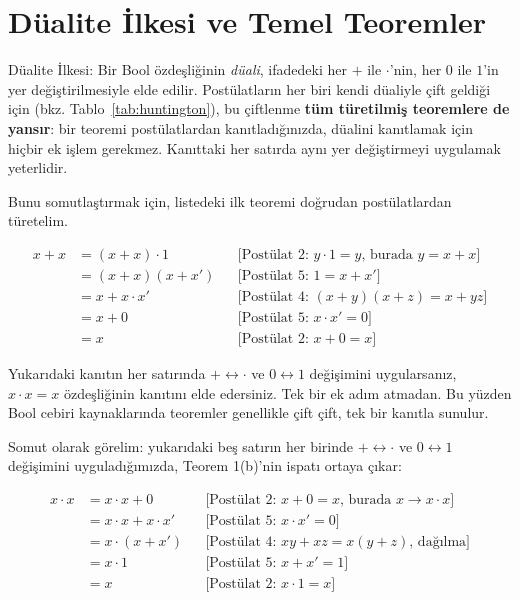 \section{Düalite İlkesi ve Temel Teoremler}
\label{sec:dualite}

\begin{tanim}{Düalite İlkesi:}
Bir Bool özdeşliğinin \emph{düali}, ifadedeki her $+$ ile $\cdot$'nin, her $0$ ile $1$'in yer
değiştirilmesiyle elde edilir. Postülatların her biri kendi düaliyle çift geldiği için (bkz.
Tablo~\ref{tab:huntington}), bu çiftlenme \textbf{tüm türetilmiş teoremlere de yansır}: bir teoremi
postülatlardan kanıtladığınızda, düalini kanıtlamak için hiçbir ek işlem gerekmez. Kanıttaki
her satırda aynı yer değiştirmeyi uygulamak yeterlidir.
\end{tanim}

Bunu somutlaştırmak için, listedeki ilk teoremi doğrudan postülatlardan türetelim.

\begin{ornek}[Teorem 1'in Postülatlardan Türetilmesi: $x+x=x$]
\begin{align*}
x+x &= (x+x)\cdot 1 & &\text{[Postülat 2: } y\cdot 1=y \text{, burada } y=x+x \text{]}\\
    &= (x+x)(x+x') & &\text{[Postülat 5: } 1=x+x' \text{]}\\
    &= x+x\cdot x' & &\text{[Postülat 4: } (x+y)(x+z)=x+yz \text{]}\\
    &= x+0 & &\text{[Postülat 5: } x\cdot x'=0 \text{]}\\
    &= x & &\text{[Postülat 2: } x+0=x \text{]}
\end{align*}
\end{ornek}

\begin{bilginot}
Yukarıdaki kanıtın her satırında $+ \leftrightarrow \cdot$ ve $0 \leftrightarrow 1$ değişimini
uygularsanız, $x\cdot x=x$ özdeşliğinin kanıtını elde edersiniz. Tek bir ek adım atmadan.
Bu yüzden Bool cebiri kaynaklarında teoremler genellikle çift çift, tek bir kanıtla sunulur.
\end{bilginot}

Somut olarak görelim: yukarıdaki beş satırın her birinde $+\leftrightarrow\cdot$ ve
$0\leftrightarrow 1$ değişimini uyguladığımızda, Teorem 1(b)'nin ispatı ortaya çıkar:

\begin{align*}
x\cdot x &= x\cdot x+0 & &\text{[Postülat 2: } x+0=x \text{, burada } x\to x\cdot x \text{]}\\
    &= x\cdot x+x\cdot x' & &\text{[Postülat 5: } x\cdot x'=0 \text{]}\\
    &= x\cdot(x+x') & &\text{[Postülat 4: } xy+xz=x(y+z) \text{, dağılma]}\\
    &= x\cdot 1 & &\text{[Postülat 5: } x+x'=1 \text{]}\\
    &= x & &\text{[Postülat 2: } x\cdot 1=x \text{]}
\end{align*}


